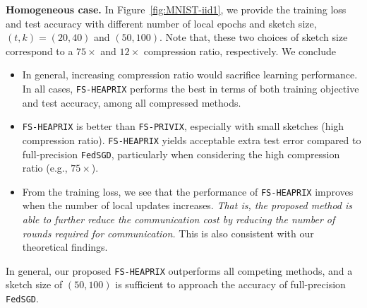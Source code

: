 \documentclass{article} %
\begin{document}
\textbf{Homogeneous case.} In Figure~\ref{fig:MNIST-iid1}, we provide the training loss and test accuracy with different number of local epochs and sketch size, $(t,k)=(20,40)$ and $(50,100)$. 
Note that, these two choices of sketch size correspond to a $75\times$ and $12\times$ compression ratio, respectively. We conclude
\begin{itemize}
    \item In general, increasing compression ratio would sacrifice learning performance. In all cases, \texttt{FS-HEAPRIX} performs the best in terms of both training objective and test accuracy, among all compressed methods.
    
    \item \texttt{FS-HEAPRIX} is better than \texttt{FS-PRIVIX}, especially with small sketches (high compression ratio). \texttt{FS-HEAPRIX} yields acceptable extra test error compared to full-precision \texttt{FedSGD}, particularly when considering the high compression ratio (e.g., $75\times$). 
    
    \item From the training loss, we see that the performance of \texttt{FS-HEAPRIX} improves when the number of local updates increases. \emph{That is, the proposed method is able to further reduce the communication cost by reducing the number of rounds required for communication.} This is also consistent with our theoretical findings. 
\end{itemize}
In general, our proposed \texttt{FS-HEAPRIX} outperforms all competing methods, and a sketch size of $(50,100)$ is sufficient to approach the accuracy of full-precision \texttt{FedSGD}.
\end{document}
